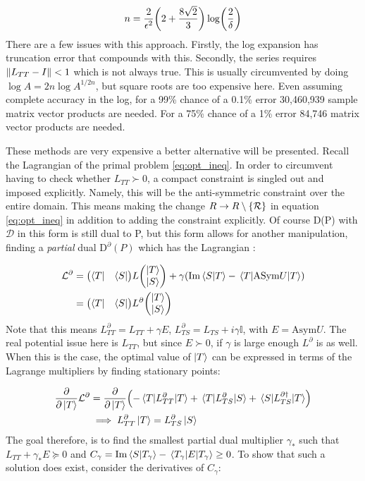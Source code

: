 \documentclass[twocolumn]{revtex4-2}
\begin{document}
\begin{align}
n = \frac{2}{\epsilon^2}\qty(2+\frac{8\sqrt{2}}{3})\log(\frac{2}{\delta})
\end{align}
There are a few issues with this approach. Firstly, the log expansion has truncation error that compounds with this. Secondly, the series requires $\norm{L_{TT} - I} < 1$ which is not always true. This is usually circumvented by doing $\log A = 2n\log A^{1/2n}$, but square roots are too expensive here. Even assuming complete accuracy in the log, for a 99\% chance of a 0.1\% error 30,460,939 sample matrix vector products are needed. For a 75\% chance of a 1\% error 84,746 matrix vector products are needed.

These methods are very expensive a better alternative will be presented. Recall the Lagrangian of the primal problem \ref{eq:opt_ineq}. In order to circumvent having to check whether $L_{TT}\succ 0$, a compact constraint is singled out and imposed explicitly. Namely, this will be the anti-symmetric constraint over the entire domain. This means making the change $R\rightarrow R\setminus\qty{\mathcal{R}}$ in equation \ref{eq:opt_ineq} in addition to adding the constraint explicitly. Of course D(P) with $\mathcal{D}$ in this form is still dual to P, but this form allows for another manipulation, finding a \textit{partial} dual $\text{D}^\partial(P)$ which has the Lagrangian \cite{molesky2020hierarchical}:

\begin{align}
	\mathcal{L}^\partial &= \mqty(\bra{T} & \bra{S})L\mqty(\ket{T} \\ \ket{S}) + \gamma\qty(\Im\braket{S}{T} - \ev{\text{ASym}U}{T})\nonumber\\
	&=\mqty(\bra{T} & \bra{S})L^\partial\mqty(\ket{T} \\ \ket{S})
\end{align}
Note that this means $L^\partial_{TT} = L_{TT} + \gamma E$, $L^\partial_{TS} = L_{TS} + i\gamma\mathbb{I}$, with $E=\text{Asym} U$. The real potential issue here is $L_{TT}$, but since $E\succ 0$, if $\gamma$ is large enough $L^\partial$ is as well. When this is the case, the optimal value of $\ket{T}$ can be expressed in terms of the Lagrange multipliers by finding stationary points:

\begin{align}
\frac{\partial}{\partial\ket{T}}\mathcal{L}^\partial &= \frac{\partial}{\partial\ket{T}}\qty(-\ev{L^\partial_{TT}}{T} + \mel{T}{L^\partial_{TS}}{S} + \mel{S}{L^{\partial\dagger}_{TS}}{T})\nonumber\\
&\implies L^\partial_{TT}\ket{T} = L^\partial_{TS}\ket{S}
\end{align}
The goal therefore, is to find the smallest partial dual multiplier $\gamma_*$ such that $L_{TT} + \gamma_* E\succcurlyeq 0$ and $C_\gamma =\Im\braket{S}{T_\gamma} - \ev{E}{T_\gamma}\ge 0$. To show that such a solution does exist, consider the derivatives of $C_\gamma$:
\end{document}
